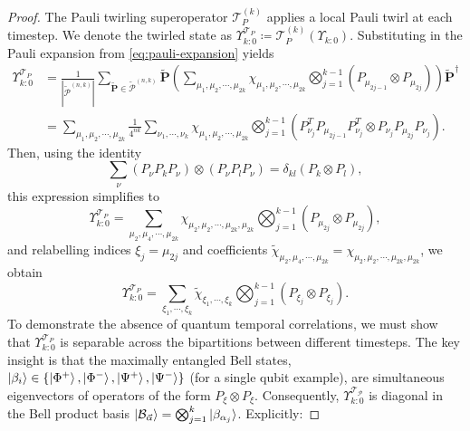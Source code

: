 \begin{proof}
The Pauli twirling superoperator \(\mathcal{T}_P^{(k)}\) applies a local Pauli twirl at each timestep. We denote the twirled state as \(\Upsilon_{k:0}^{\mathcal{T}_P} \coloneq \mathcal{T}_P^{(k)}(\Upsilon_{k:0})\). Substituting in the Pauli expansion from \cref{eq:pauli-expansion} yields
\begin{equation}
    \begin{split}
    \Upsilon_{k:0}^{\mathcal{T}_P} &= \frac{1}{|\tilde{\mathcal{P}}^{(n,k)}|}\sum_{\tilde{\mathbf{P}} \in \tilde{\mathcal{P}}^{(n,k)}}\tilde{\mathbf{P}}\left(\sum_{{\mu_1,\mu_2,\cdots,\mu_{2k}}}\chi_{\mu_1,\mu_2,\cdots,\mu_{2k}} \bigotimes_{j=1}^{k-1}(P_{\mu_{2j-1}}\otimes P_{\mu_{2j}})\right)\tilde{\mathbf{P}}^\dagger\\
    &=  \sum_{\mu_1,\mu_2,\cdots,\mu_{2k}}\frac{1}{4^{nk}} \sum_{\nu_1,\cdots,\nu_k} \chi_{\mu_1,\mu_2,\cdots,\mu_{2k}} \bigotimes_{j=1}^{k-1}(P_{\nu_j}^TP_{\mu_{2j-1}}P_{\nu_j}^T\otimes P_{\nu_j}P_{\mu_{2j}}P_{\nu_j}).
    \end{split}
\end{equation}
Then, using the identity
\begin{equation}
    \sum_\nu (P_\nu P_k P_\nu) \otimes (P_\nu P_l P_\nu) = \delta_{kl}(P_k \otimes P_l),
\end{equation}
this expression simplifies to
\begin{equation}
    \Upsilon_{k:0}^{\mathcal{T}_P} =  \sum_{\mu_2,\mu_4,\cdots,\mu_{2k}}\chi_{\mu_2,\mu_2,\cdots,\mu_{2k},\mu_{2k}} \bigotimes_{j=1}^{k-1}(P_{\mu_{2j}}\otimes P_{\mu_{2j}}),
\end{equation}
and relabelling indices \(\xi_j = \mu_{2j}\) and coefficients \(\tilde{\chi}_{\mu_2,\mu_4,\cdots,\mu_{2k}} = \chi_{\mu_2,\mu_2,\cdots,\mu_{2k},\mu_{2k}}\), we obtain
\begin{equation}\label{eq:ppt-pauli-basis}
    \Upsilon_{k:0}^{\mathcal{T}_P}  = \sum_{\xi_1,\cdots,\xi_k} \tilde{\chi}_{\xi_1,\cdots,\xi_k} \bigotimes_{j=1}^{k-1}(P_{\xi_j}\otimes P_{\xi_j}).
\end{equation}
To demonstrate the absence of quantum temporal correlations, we must show that \(\Upsilon_{k:0}^{\mathcal{T}_P}\) is separable across the bipartitions between different timesteps. The key insight is that the maximally entangled Bell states, \(\ket{\beta_i} \in \{\ket{\Phi^+}, \ket{\Phi^-}, \ket{\Psi^+}, \ket{\Psi^-}\}\) (for a single qubit example), are simultaneous eigenvectors of operators of the form \(P_\xi \otimes P_\xi\). Consequently, \(\Upsilon_{k:0}^{\mathcal{T_P}}\) is diagonal in the Bell product basis \(\ket{\mathcal{B}_{\vec{\alpha}}}=\bigotimes_{j=1}^k \ket{\beta_{\alpha_j}}\). Explicitly:

\end{proof}
